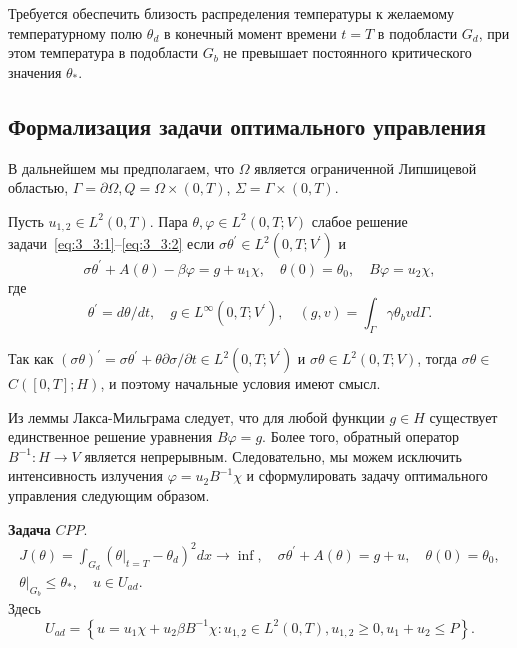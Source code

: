 Требуется обеспечить близость распределения температуры к желаемому температурному полю $\theta_{d}$
в конечный момент времени $t=T$ в подобласти $G_{d}$, при этом температура в подобласти $G_{b}$
не превышает постоянного критического значения $\theta_{*}$.

\subsection{Формализация задачи оптимального управления}\label{subsec:ch3:sec3:subsec2}

В дальнейшем мы предполагаем, что $\Omega $ является ограниченной Липшицевой областью,
$\Gamma =\partial \Omega, Q =\Omega \times(0, T)$, $\Sigma=\Gamma \times(0, T)$.

\begin{definition}
    Пусть $u_{1,2} \in L^{2}(0, T)$.
    Пара $\theta, \varphi \in L^{2}(0, T ; V)$ слабое решение задачи~\eqref{eq:3_3:1}--\eqref{eq:3_3:2} если
    $\sigma \theta^{\prime} \in L^{2}\left(0, T ; V^{\prime}\right)$ и
    \begin{equation}
        \label{eq:3_3:3}
        \sigma \theta^{\prime}+A(\theta)-\beta \varphi=g+u_{1} \chi,
        \quad \theta(0)=\theta_{0}, \quad B \varphi=u_{2} \chi,
    \end{equation}
    где
    \[
        \theta^{\prime}=d \theta / d t, \quad g \in L^{\infty}\left(0, T ; V^{\prime}\right),
        \quad(g, v)=\int_{\Gamma} \gamma \theta_{b} v d \Gamma.
    \]
\end{definition}

\begin{remark}
    Так как $(\sigma \theta)^{\prime}=\sigma \theta^{\prime}+\theta
    \partial \sigma / \partial t \in L^{2}\left(0, T ; V^{\prime}\right)$ и $\sigma
    \theta \in L^{2}(0, T ; V)$, тогда $\sigma \theta \in$ $C([0, T] ; H)$,
    и поэтому начальные условия имеют смысл.
\end{remark}

Из леммы Лакса-Мильграма следует, что для любой функции $g \in H$ существует единственное
решение уравнения $B\varphi= g$.
Более того, обратный оператор $B^{-1}: H \rightarrow V$ является непрерывным.
Следовательно, мы можем исключить интенсивность излучения $\varphi=u_{2} B^{-1} \chi$
и сформулировать задачу оптимального управления следующим образом.


\textbf{Задача} $CPP$.
\[
    \begin{gathered}
        J(\theta)=\int_{G_{d}}\left(\left.\theta\right|_{t=T}
        - \theta_{d}\right)^{2} d x \rightarrow \inf,
        \quad \sigma \theta^{\prime}+A(\theta)=g+u, \quad \theta(0)=\theta_{0}, \\
        \left.\theta\right|_{G_{b}} \leq \theta_{*}, \quad u \in U_{a d}.
    \end{gathered}
\]
Здесь
\[
    U_{a d}=\left\{u=u_{1} \chi+u_{2} \beta B^{-1} \chi: u_{1,2} \in L^{2}(0, T), u_{1,2}
    \geq 0, u_{1}+u_{2} \leq P\right\}.
\]

